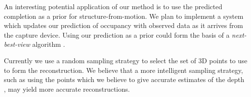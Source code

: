 \documentclass[10pt,twocolumn,letterpaper]{article}
\begin{document}
An interesting potential application of our method is to use the predicted completion as a prior for structure-from-motion.
We plan to implement a system which updates our prediction of occupancy with observed data as it arrives from the capture device.
Using our prediction as a prior could form the basis of a \emph{next-best-view} algorithm \cite{Potthast2014148}.

Currently we use a random sampling strategy to select the set of 3D points to use to form the reconstruction.
We believe that a more intelligent sampling strategy, such as using the points which we believe to give accurate estimates of the depth \cite{reynolds-cvpr-2011}, may yield more accurate reconstructions.



{\small


}
\end{document}
